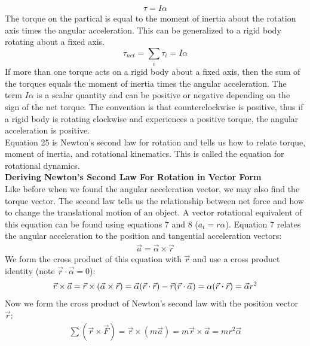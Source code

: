 \documentclass[a4paper]{article}
\let\bf\textbf
\begin{document}
\begin{align*}
    \tau = I\alpha
\end{align*}
The torque on the partical is equal to the moment of inertia about the rotation axis times the angular acceleration. This can be generalized to a rigid body rotating about a fixed axis.
\begin{equation}
    \tau_{net} = \sum_{i}\tau_i = I\alpha
\end{equation}
If more than one torque acts on a rigid body about a fixed axis, then the sum of the torques equals the moment of inertia times the angular acceleration. The term $I\alpha$ is a scalar quantity and can be positive or negative depending on the sign of the net torque. The convention is that counterclockwise is positive, thus if a rigid body is rotating clockwise and experiences a positive torque, the angular acceleration is positive.
\vspace{1mm}\\
Equation 25 is Newton's second law for rotation and tells us how to relate torque, moment of inertia, and rotational kinematics. This is called the equation for rotational dynamics. 
\vspace{2mm}\\
\bf{Deriving Newton's Second Law For Rotation in Vector Form}
\vspace{2mm}\\
Like before when we found the angular acceleration vector, we may also find the torque vector. The second law tells us the relationship between net force and how to change the translational motion of an object. A vector rotational equivalent of this equation can be found using equations 7 and 8 ($a_t = r\alpha$). Equation 7 relates the angular acceleration to the position and tangential acceleration vectors:
\begin{align*}
    \vec{a} = \vec{\alpha} \times \vec{r}
\end{align*}
We form the cross product of this equation with $\vec{r}$ and use a cross product identity (note $\vec{r}\cdot\vec{\alpha} = 0$):
\begin{align*}
    \vec{r}\times\vec{a} = \vec{r}\times(\vec{\alpha}\times\vec{r}) = \vec{\alpha}(\vec{r}\cdot\vec{r}) - \vec{r}(\vec{r}\cdot\vec{\alpha}) = \alpha(\vec{r}\vdot\vec{r}) = \vec{\alpha}r^2
\end{align*}
Now we form the cross product of Newton's second law with the position vector $\vec{r}$:
\begin{align*}
    \sum(\vec{r}\times\vec{F}) = \vec{r}\times(m\vec{a}) = m\vec{r}\times\vec{a} = mr^2\vec{\alpha}
\end{align*}
\end{document}
